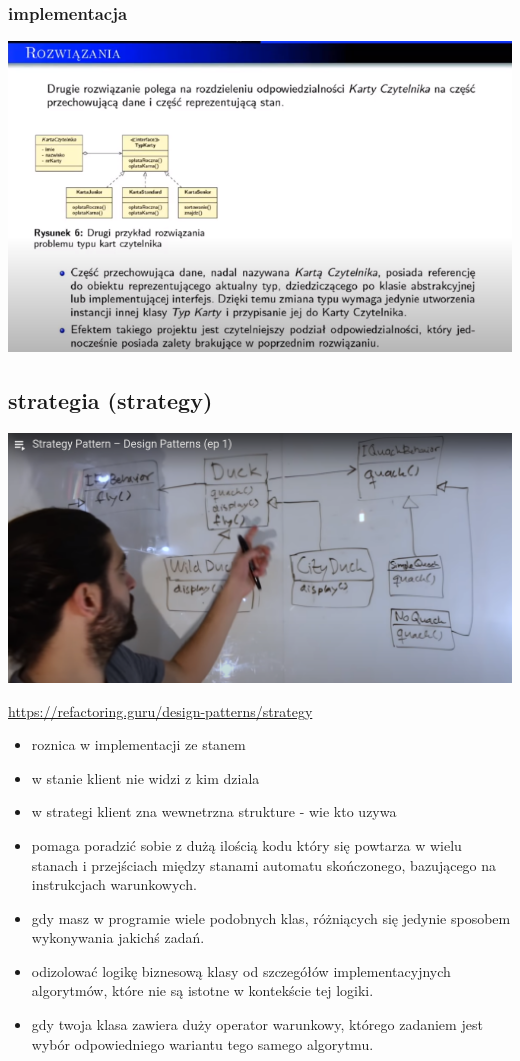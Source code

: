 \documentclass[11pt]{article}
\begin{document}
\subsubsection{implementacja}
\label{sec:org4cb1531}
\begin{center}
\includegraphics[width=.9\linewidth]{./stan.png}
\end{center}
\subsection{strategia (strategy)}
\label{sec:org6bb926f}
\begin{center}
\includegraphics[width=.9\linewidth]{./strategy.png}
\end{center}

\url{https://refactoring.guru/design-patterns/strategy}
\begin{itemize}
\item roznica w implementacji ze stanem
\item w stanie klient nie widzi z kim dziala
\item w strategi klient zna wewnetrzna strukture - wie kto uzywa
\item pomaga poradzić sobie z dużą ilością kodu który się powtarza w wielu stanach i przejściach między stanami automatu skończonego, bazującego na instrukcjach warunkowych.
\item gdy masz w programie wiele podobnych klas, różniących się jedynie sposobem wykonywania jakichś zadań.
\item odizolować logikę biznesową klasy od szczegółów implementacyjnych algorytmów, które nie są istotne w kontekście tej logiki.
\item gdy twoja klasa zawiera duży operator warunkowy, którego zadaniem jest wybór odpowiedniego wariantu tego samego algorytmu.
\end{itemize}
\end{document}
